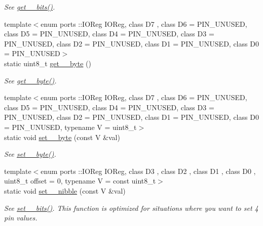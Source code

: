 \begin{DoxyCompactItemize}
\begin{DoxyCompactList}\small\item\em See \hyperlink{namespaceports_a9a1959ec95780c00a964b174a27b2a37}{get\+\_\+\_\+bits()}. \end{DoxyCompactList}\item 
{\footnotesize template$<$enum ports \+::\+I\+O\+Reg I\+O\+Reg, class D7 , class D6  = P\+I\+N\+\_\+\+U\+N\+U\+S\+ED, class D5  = P\+I\+N\+\_\+\+U\+N\+U\+S\+ED, class D4  = P\+I\+N\+\_\+\+U\+N\+U\+S\+ED, class D3  = P\+I\+N\+\_\+\+U\+N\+U\+S\+ED, class D2  = P\+I\+N\+\_\+\+U\+N\+U\+S\+ED, class D1  = P\+I\+N\+\_\+\+U\+N\+U\+S\+ED, class D0  = P\+I\+N\+\_\+\+U\+N\+U\+S\+ED$>$ }\\static uint8\+\_\+t \hyperlink{namespaceports_abcf67102d107c0aaad21fbb9f15563ae}{get\+\_\+\_\+byte} ()
\begin{DoxyCompactList}\small\item\em See \hyperlink{namespaceports_ae7d1ffc9ed6454ca61b006ffe43e4e6e}{get\+\_\+\_\+byte()}. \end{DoxyCompactList}\item 
{\footnotesize template$<$enum ports \+::\+I\+O\+Reg I\+O\+Reg, class D7 , class D6  = P\+I\+N\+\_\+\+U\+N\+U\+S\+ED, class D5  = P\+I\+N\+\_\+\+U\+N\+U\+S\+ED, class D4  = P\+I\+N\+\_\+\+U\+N\+U\+S\+ED, class D3  = P\+I\+N\+\_\+\+U\+N\+U\+S\+ED, class D2  = P\+I\+N\+\_\+\+U\+N\+U\+S\+ED, class D1  = P\+I\+N\+\_\+\+U\+N\+U\+S\+ED, class D0  = P\+I\+N\+\_\+\+U\+N\+U\+S\+ED, typename V  = uint8\+\_\+t$>$ }\\static void \hyperlink{namespaceports_a61265646961334c58df6d4ed66e290d0}{set\+\_\+\_\+byte} (const V \&val)
\begin{DoxyCompactList}\small\item\em See \hyperlink{namespaceports_a7034c689dd509dc9c11ba8be46a26fd0}{set\+\_\+\_\+byte()}. \end{DoxyCompactList}\item 
{\footnotesize template$<$enum ports \+::\+I\+O\+Reg I\+O\+Reg, class D3 , class D2 , class D1 , class D0 , uint8\+\_\+t offset = 0, typename V  = const uint8\+\_\+t$>$ }\\static void \hyperlink{namespaceports_af6d35bb70c3973212025200a2af3ac5c}{set\+\_\+\_\+nibble} (const V \&val)
\begin{DoxyCompactList}\small\item\em See \hyperlink{namespaceports_aac15fb87d8fede3f2bf8d764ab42965f}{set\+\_\+\_\+bits()}. This function is optimized for situations where you want to set 4 pin values. \end{DoxyCompactList}\end{DoxyCompactItemize}


